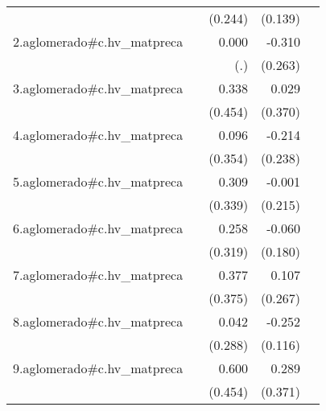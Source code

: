 {\begin{longtable}{l*{4}{D{.}{.}{-1}}}
            &                     &     (0.244)         &     (0.139)         &                     \\
\addlinespace
2.aglomerado#c.hv\_matpreca&                     &       0.000         &      -0.310         &                     \\
            &                     &         (.)         &     (0.263)         &                     \\
\addlinespace
3.aglomerado#c.hv\_matpreca&                     &       0.338         &       0.029         &                     \\
            &                     &     (0.454)         &     (0.370)         &                     \\
\addlinespace
4.aglomerado#c.hv\_matpreca&                     &       0.096         &      -0.214         &                     \\
            &                     &     (0.354)         &     (0.238)         &                     \\
\addlinespace
5.aglomerado#c.hv\_matpreca&                     &       0.309         &      -0.001         &                     \\
            &                     &     (0.339)         &     (0.215)         &                     \\
\addlinespace
6.aglomerado#c.hv\_matpreca&                     &       0.258         &      -0.060         &                     \\
            &                     &     (0.319)         &     (0.180)         &                     \\
\addlinespace
7.aglomerado#c.hv\_matpreca&                     &       0.377         &       0.107         &                     \\
            &                     &     (0.375)         &     (0.267)         &                     \\
\addlinespace
8.aglomerado#c.hv\_matpreca&                     &       0.042         &      -0.252\sym{*}  &                     \\
            &                     &     (0.288)         &     (0.116)         &                     \\
\addlinespace
9.aglomerado#c.hv\_matpreca&                     &       0.600         &       0.289         &                     \\
            &                     &     (0.454)         &     (0.371)         &                     \\

\end{longtable}}
